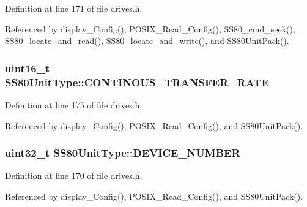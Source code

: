 Definition at line 171 of file drives.\+h.



Referenced by display\+\_\+\+Config(), P\+O\+S\+I\+X\+\_\+\+Read\+\_\+\+Config(), S\+S80\+\_\+cmd\+\_\+seek(), S\+S80\+\_\+locate\+\_\+and\+\_\+read(), S\+S80\+\_\+locate\+\_\+and\+\_\+write(), and S\+S80\+Unit\+Pack().

\subsubsection[{\texorpdfstring{C\+O\+N\+T\+I\+N\+O\+U\+S\+\_\+\+T\+R\+A\+N\+S\+F\+E\+R\+\_\+\+R\+A\+TE}{CONTINOUS_TRANSFER_RATE}}]{\setlength{\rightskip}{0pt plus 5cm}uint16\+\_\+t S\+S80\+Unit\+Type\+::\+C\+O\+N\+T\+I\+N\+O\+U\+S\+\_\+\+T\+R\+A\+N\+S\+F\+E\+R\+\_\+\+R\+A\+TE}\hypertarget{structSS80UnitType_a0486673977da185f2f69aaff378f81a2}{}\label{structSS80UnitType_a0486673977da185f2f69aaff378f81a2}


Definition at line 175 of file drives.\+h.



Referenced by display\+\_\+\+Config(), P\+O\+S\+I\+X\+\_\+\+Read\+\_\+\+Config(), and S\+S80\+Unit\+Pack().

\subsubsection[{\texorpdfstring{D\+E\+V\+I\+C\+E\+\_\+\+N\+U\+M\+B\+ER}{DEVICE_NUMBER}}]{\setlength{\rightskip}{0pt plus 5cm}uint32\+\_\+t S\+S80\+Unit\+Type\+::\+D\+E\+V\+I\+C\+E\+\_\+\+N\+U\+M\+B\+ER}\hypertarget{structSS80UnitType_a69cad18aab93449fbd91445c4ba62928}{}\label{structSS80UnitType_a69cad18aab93449fbd91445c4ba62928}


Definition at line 170 of file drives.\+h.



Referenced by display\+\_\+\+Config(), P\+O\+S\+I\+X\+\_\+\+Read\+\_\+\+Config(), and S\+S80\+Unit\+Pack().

